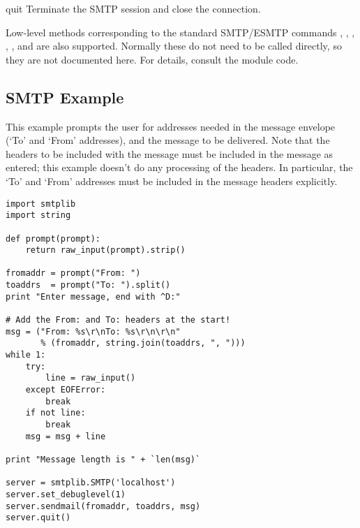 \begin{methoddesc}{quit}{}
Terminate the SMTP session and close the connection.
\end{methoddesc}

Low-level methods corresponding to the standard SMTP/ESMTP commands
, , , , , and
 are also supported.  Normally these do not need to be
called directly, so they are not documented here.  For details,
consult the module code.


\subsection{SMTP Example \label{SMTP-example}}

This example prompts the user for addresses needed in the message
envelope (`To' and `From' addresses), and the message to be
delivered.  Note that the headers to be included with the message must 
be included in the message as entered; this example doesn't do any
processing of the  headers.  In particular, the `To' and
`From' addresses must be included in the message headers explicitly.

\begin{verbatim}
import smtplib
import string

def prompt(prompt):
    return raw_input(prompt).strip()

fromaddr = prompt("From: ")
toaddrs  = prompt("To: ").split()
print "Enter message, end with ^D:"

# Add the From: and To: headers at the start!
msg = ("From: %s\r\nTo: %s\r\n\r\n"
       % (fromaddr, string.join(toaddrs, ", ")))
while 1:
    try:
        line = raw_input()
    except EOFError:
        break
    if not line:
        break
    msg = msg + line

print "Message length is " + `len(msg)`

server = smtplib.SMTP('localhost')
server.set_debuglevel(1)
server.sendmail(fromaddr, toaddrs, msg)
server.quit()
\end{verbatim}
